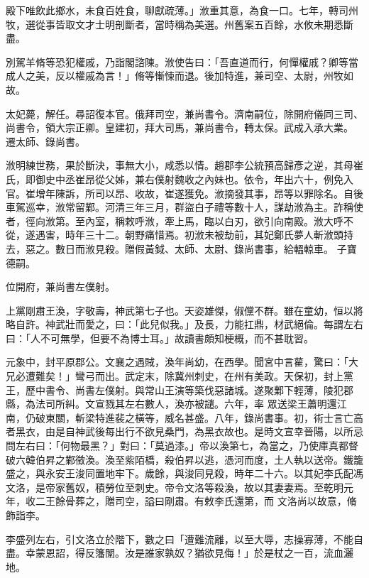 \begin{pinyinscope}
 殿下唯飲此鄉水，未食百姓食，聊獻疏薄。」浟重其意，為食一口。七年，轉司州牧，選從事皆取文才士明剖斷者，當時稱為美選。州舊案五百餘，水攸未期悉斷盡。



 別駕羊脩等恐犯權戚，乃詣閣諮陳。浟使告曰：「吾直道而行，何憚權戚？卿等當成人之美，反以權戚為言！」脩等慚悚而退。後加特進，兼司空、太尉，州牧如故。



 太妃薨，解任。尋詔復本官。俄拜司空，兼尚書令。濟南嗣位，除開府儀同三司、尚書令，領大宗正卿。皇建初，拜大司馬，兼尚書令，轉太保。武成入承大業。
 遷太師、錄尚書。



 浟明練世務，果於斷決，事無大小，咸悉以情。趙郡李公統預高歸彥之逆，其母崔氏，即御史中丞崔昂從父姊，兼右僕射魏收之內妹也。依令，年出六十，例免入官。崔增年陳訴，所司以昂、收故，崔遂獲免。浟摘發其事，昂等以罪除名。自後車駕巡幸，浟常留鄴。河清三年三月，群盜白子禮等數十人，謀劫浟為主。詐稱使者，徑向浟第。至內室，稱敕呼浟，牽上馬，臨以白刃，欲引向南殿。浟大呼不從，遂遇害，時年三十二。朝野痛惜焉。初浟未被劫前，其妃鄭氏夢人斬浟頭持去，惡之。數日而浟見殺。贈假黃鉞、太師、太尉、錄尚書事，給轀輬車。
 子寶德嗣。



 位開府，兼尚書左僕射。



 上黨剛肅王渙，字敬壽，神武第七子也。天姿雄傑，俶儻不群。雖在童幼，恒以將略自許。神武壯而愛之，曰：「此兒似我。」及長，力能扛鼎，材武絕倫。每謂左右曰：「人不可無學，但要不為博士耳。」故讀書頗知梗概，而不甚耽習。



 元象中，封平原郡公。文襄之遇賊，渙年尚幼，在西學。聞宮中言雚，驚曰：「大兄必遭難矣！」彎弓而出。武定末，除冀州刺史，在州有美政。天保初，封上黨王，歷中書令、尚書左僕射。與常山王演等築伐惡諸城。遂聚鄴下輕薄，陵犯郡縣，為法司所糾。文宣戮其左右數人，渙亦被譴。六年，率
 眾送梁王蕭明還江南，仍破東關，斬梁特進裴之橫等，威名甚盛。八年，錄尚書事。初，術士言亡高者黑衣，由是自神武後每出行不欲見桑門，為黑衣故也。是時文宣幸晉陽，以所忌問左右曰：「何物最黑？」對曰：「莫過漆。」帝以渙第七，為當之，乃使庫真都督破六韓伯昇之鄴徵渙。渙至紫陌橋，殺伯昇以逃，憑河而度，土人執以送帝。鐵籠盛之，與永安王浚同置地牢下。歲餘，與浚同見殺，時年二十六。以其妃李氏配馮文洛，是帝家舊奴，積勞位至刺史。帝令文洛等殺渙，故以其妻妻焉。至乾明元年，收二王餘骨葬之，贈司空，謚曰剛肅。有敕李氏還第，而
 文洛尚以故意，脩飾詣李。



 李盛列左右，引文洛立於階下，數之曰「遭難流離，以至大辱，志操寡薄，不能自盡。幸蒙恩詔，得反籓闈。汝是誰家孰奴？猶欲見侮！」於是杖之一百，流血灑地。




\end{pinyinscope}
